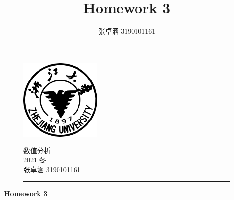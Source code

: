 \documentclass[a4paper,11.5pt,UTF8]{ctexart}
\title{Homework 3}
\author{张卓涵 3190101161}
\begin{document}
\begin{figure}[t]
\begin{minipage}[h]{0.25\linewidth}
	\includegraphics[width=4.0cm]{ZJU2.jpeg}
\end{minipage}
\hfill
\begin{minipage}[h]{.7\linewidth}
	\begin{flushright}
			\Large{数值分析
				\vspace{3mm}	\\
				   2021 冬
				\vspace{3mm}	\\
				   张卓涵 \hspace{3mm}3190101161}
	\end{flushright}
\end{minipage}
\rule{\linewidth}{0.1em}
\end{figure}
\begin{center}
	\huge{\textbf{Homework 3}}
\end{center}
\end{document}
